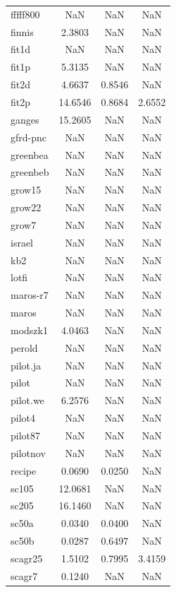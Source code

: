 \begin{longtable}{lccc}
fffff800 &     NaN &     NaN &    NaN \\
finnis   &  2.3803 &     NaN &    NaN \\
fit1d    &     NaN &     NaN &    NaN \\
fit1p    &  5.3135 &     NaN &    NaN \\
fit2d    &  4.6637 &  0.8546 &    NaN \\
fit2p    & 14.6546 &  0.8684 & 2.6552 \\
ganges   & 15.2605 &     NaN &    NaN \\
gfrd-pnc &     NaN &     NaN &    NaN \\
greenbea &     NaN &     NaN &    NaN \\
greenbeb &     NaN &     NaN &    NaN \\
grow15   &     NaN &     NaN &    NaN \\
grow22   &     NaN &     NaN &    NaN \\
grow7    &     NaN &     NaN &    NaN \\
israel   &     NaN &     NaN &    NaN \\
kb2      &     NaN &     NaN &    NaN \\
lotfi    &     NaN &     NaN &    NaN \\
maros-r7 &     NaN &     NaN &    NaN \\
maros    &     NaN &     NaN &    NaN \\
modszk1  &  4.0463 &     NaN &    NaN \\
perold   &     NaN &     NaN &    NaN \\
pilot.ja &     NaN &     NaN &    NaN \\
pilot    &     NaN &     NaN &    NaN \\
pilot.we &  6.2576 &     NaN &    NaN \\
pilot4   &     NaN &     NaN &    NaN \\
pilot87  &     NaN &     NaN &    NaN \\
pilotnov &     NaN &     NaN &    NaN \\
recipe   &  0.0690 &  0.0250 &    NaN \\
sc105    & 12.0681 &     NaN &    NaN \\
sc205    & 16.1460 &     NaN &    NaN \\
sc50a    &  0.0340 &  0.0400 &    NaN \\
sc50b    &  0.0287 &  0.6497 &    NaN \\
scagr25  &  1.5102 &  0.7995 & 3.4159 \\
scagr7   &  0.1240 &     NaN &    NaN \\

\end{longtable}
